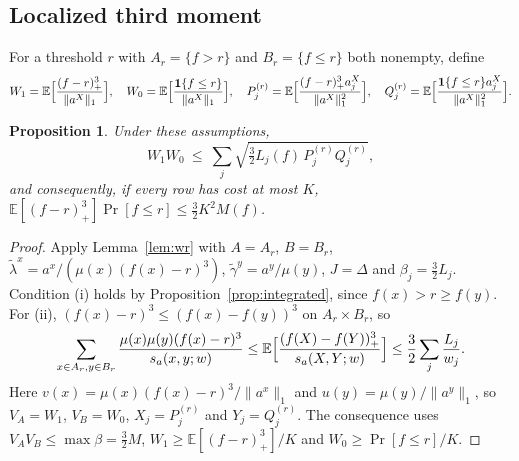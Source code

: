 \documentclass[11pt]{article}
\numberwithin{equation}{section}
\newtheorem{proposition}[theorem]{Proposition}
\theoremstyle{definition}
\theoremstyle{remark}
\newcommand{\E}{\mathbb{E}}
\newcommand{\1}{\mathbf 1}
\newcommand{\nrm}[1]{\lVert #1\rVert_1}
\begin{document}
\subsection{Localized third moment}
For a threshold $r$ with $A_r=\{f>r\}$ and $B_r=\{f\le r\}$ both nonempty, define
\[
W_1=\E\Bigl[\frac{(f-r)_+^3}{\nrm{a^X}}\Bigr],\quad W_0=\E\Bigl[\frac{\1\{f\le r\}}{\nrm{a^X}}\Bigr],\quad
P_j^{(r)}=\E\Bigl[\frac{(f-r)_+^3a^X_j}{\nrm{a^X}^2}\Bigr],\quad Q_j^{(r)}=\E\Bigl[\frac{\1\{f\le r\}a^X_j}{\nrm{a^X}^2}\Bigr].
\]
\begin{proposition}\label{prop:third}
Under these assumptions,
\begin{equation}\label{eq:localthird}
W_1W_0\ \le\ \sum_j\sqrt{\tfrac32L_j(f)\,P_j^{(r)}Q_j^{(r)}},
\end{equation}
and consequently, if every row has cost at most $K$, $\E[(f-r)_+^3]\Pr[f\le r]\le\frac32K^2M(f)$.
\end{proposition}
\begin{proof}
Apply Lemma~\ref{lem:wr} with $A=A_r$, $B=B_r$, $\tilde\lambda^x=a^x/(\mu(x)(f(x)-r)^3)$, $\tilde\gamma^y=a^y/\mu(y)$, $J=\Delta$ and $\beta_j=\frac32L_j$. Condition (i) holds by Proposition~\ref{prop:integrated}, since $f(x)>r\ge f(y)$. For (ii), $(f(x)-r)^3\le(f(x)-f(y))^3$ on $A_r\times B_r$, so
\[
\sum_{x\in A_r,y\in B_r}\frac{\mu(x)\mu(y)(f(x)-r)^3}{s_a(x,y;w)}\le\E\Bigl[\frac{(f(X)-f(Y))_+^3}{s_a(X,Y;w)}\Bigr]\le\frac32\sum_j\frac{L_j}{w_j}.
\]
Here $v(x)=\mu(x)(f(x)-r)^3/\nrm{a^x}$ and $u(y)=\mu(y)/\nrm{a^y}$, so $V_A=W_1$, $V_B=W_0$, $X_j=P^{(r)}_j$ and $Y_j=Q_j^{(r)}$. The consequence uses $V_AV_B\le\max\beta=\frac32M$, $W_1\ge\E[(f-r)_+^3]/K$ and $W_0\ge\Pr[f\le r]/K$.
\end{proof}
\end{document}
